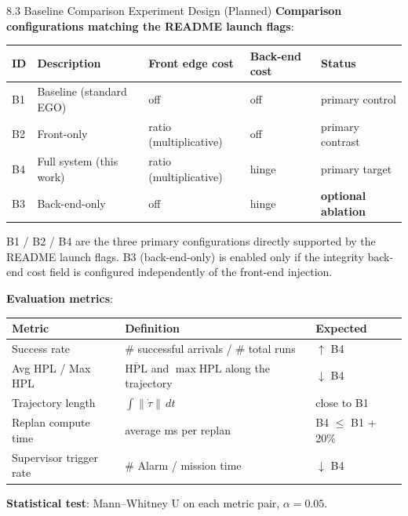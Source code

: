 \documentclass[10pt,aspectratio=169,xcolor=dvipsnames]{beamer}
\newcommand{\HPL}{\mathrm{HPL}}
\newcommand{\1}{\mathbb{1}}
\begin{document}
\begin{frame}{8.3 Baseline Comparison Experiment Design (Planned)}
  \small
  \textbf{Comparison configurations matching the README launch flags}:
  \begin{table}\scriptsize
    \begin{tabular}{lllll}
      \toprule
      ID & Description & Front edge cost & Back-end cost & Status\\
      \midrule
      B1 & Baseline (standard EGO) & off & off & primary control\\
      B2 & Front-only & ratio (multiplicative) & off & primary contrast\\
      \rowcolor{yellow!25}
      B4 & Full system (this work) & ratio (multiplicative) & hinge & primary target\\
      B3 & Back-end-only & off & hinge & \textbf{optional ablation}\\
      \bottomrule
    \end{tabular}
  \end{table}
  \scriptsize B1 / B2 / B4 are the three primary configurations directly supported by the README launch flags. B3 (back-end-only) is enabled only if the integrity back-end cost field is configured independently of the front-end injection.

  \medskip
  \textbf{Evaluation metrics}:
  \begin{table}\scriptsize
    \begin{tabular}{p{} p{} p{}}
      \toprule
      Metric & Definition & Expected\\
      \midrule
      Success rate & \# successful arrivals / \# total runs & $\uparrow$ B4\\
      Avg HPL / Max HPL & $\bar{\HPL}$ and $\max\HPL$ along the trajectory & $\downarrow$ B4\\
      Trajectory length & $\int\|\dot\tau\|\,\si{dt}$ & close to B1\\
      Replan compute time & average ms per replan & B4 $\le$ B1 + 20\%\\
      Supervisor trigger rate & \# Alarm / mission time & $\downarrow$ B4\\
      \bottomrule
    \end{tabular}
  \end{table}

  \textbf{Statistical test}: Mann--Whitney U on each metric pair, $\alpha=0.05$.
\end{frame}
\end{document}
